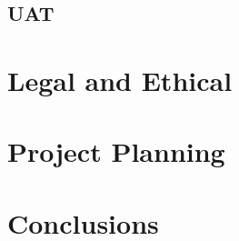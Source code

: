 \documentclass[11pt, a4paper,twoside]{report}
\theoremstyle{plain} %
\theoremstyle{definition} %
\numberwithin{equation}{chapter}
\begin{document}
\section{UAT}\label{sec:usertesting}

\chapter{Legal and Ethical}\label{ch:legalandethical}

\chapter{Project Planning}\label{ch:projectplanning}

\chapter{Conclusions}\label{ch:conclusion}



\end{document}
